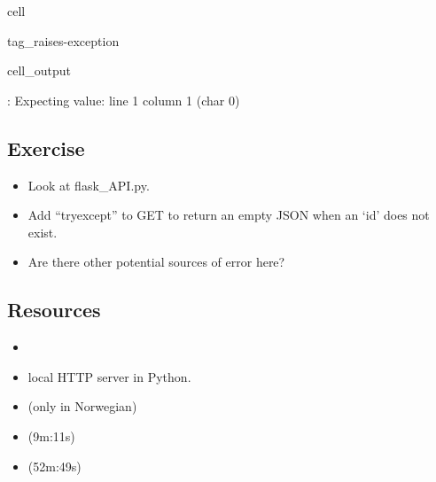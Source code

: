 \documentclass[letterpaper,10pt,english]{jupyterBook}
\begin{document}
\begin{sphinxuseclass}{cell}
\begin{sphinxuseclass}{tag_raises-exception}
\begin{sphinxVerbatimOutput}
\begin{sphinxuseclass}{cell_output}
\begin{sphinxVerbatim}[commandchars=\\\{\}]
: Expecting value: line 1 column 1 (char 0)
\end{sphinxVerbatim}

\end{sphinxuseclass}\end{sphinxVerbatimOutput}

\end{sphinxuseclass}
\end{sphinxuseclass}

\subsection{Exercise}
\label{\detokenize{2_Data_sources/APIs/REST:exercise}}\begin{itemize}
\item {} 
\sphinxAtStartPar
Look at flask\_API.py.

\item {} 
\sphinxAtStartPar
Add “try\sphinxhyphen{}except” to GET to return an empty JSON when an ‘id’ does not exist.

\item {} 
\sphinxAtStartPar
Are there other potential sources of error here?

\end{itemize}


\subsection{Resources}
\label{\detokenize{2_Data_sources/APIs/REST:resources}}\begin{itemize}
\item {} 
\sphinxAtStartPar
{}

\item {} 
\sphinxAtStartPar
{} local HTTP server in Python.

\item {} 
\sphinxAtStartPar
{} (only in Norwegian)

\item {} 
\sphinxAtStartPar
{} (9m:11s)

\item {} 
\sphinxAtStartPar
{} (52m:49s)

\end{itemize}
\end{document}
